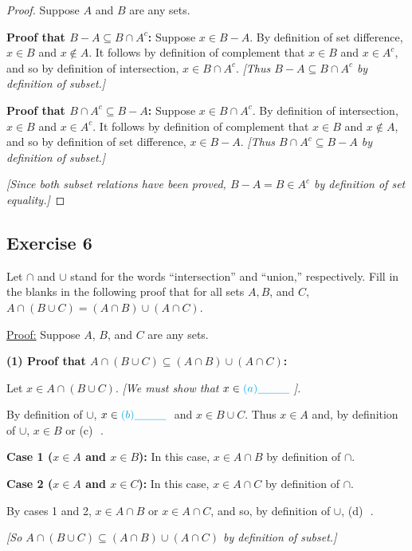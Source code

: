 \documentclass[14pt]{extarticle}
\newcommand{\fbl}{\underline{\hspace{1cm}}\,\,}
\newcommand{\cy}{\color{cyan}}
\begin{document}
\begin{proof}
  Suppose $A$ and $B$ are any sets.

    {\bf Proof that \(B - A \subseteq B \cap A^c\):} Suppose \(x \in B - A\). By definition of set difference,
  \(x \in B\) and \(x \notin A\). It follows by definition of complement that \(x \in B\) and \(x \in A^c\), and so by
  definition of intersection, \(x \in B \cap A^c\). {\it [Thus \(B - A \subseteq B \cap A^c\) by definition of subset.]}

    {\bf Proof that \(B \cap A^c \subseteq B - A\):} Suppose \(x \in B \cap A^c\). By definition of intersection,
  \(x \in B\) and \(x \in A^c\). It follows by definition of complement that \(x \in B\) and \(x \notin A\), and so by
  definition of set difference, \(x \in B - A\). {\it [Thus \(B \cap A^c \subseteq B - A\) by definition of subset.]}

    {\it [Since both subset relations have been proved, \(B - A = B \in A^c\) by definition of set equality.]}
\end{proof}

\subsection{Exercise 6}
Let $\cap$ and $\cup$ stand for the words “intersection” and “union,” respectively. Fill in the blanks in the
following proof that for all sets $A, B$, and $C$, \(A \cap (B \cup C) = (A \cap B) \cup (A \cap C)\).

\underline{Proof:} Suppose $A$, $B$, and $C$ are any sets.

  {\bf (1) Proof that \(A \cap (B \cup C) \subseteq (A \cap B) \cup (A \cap C)\):}

Let \(x \in A \cap (B \cup C)\). {\it [We must show that \(x \in {\cy (a) \fbl}\)].}

By definition of $\cup$, \(x \in {\cy (b) \fbl}\) and \(x \in B \cup C\).
Thus \(x \in A\) and, by definition of $\cup$, \(x \in B\) or {\cy (c) \fbl}.

{\bf Case 1 (\(x \in A\) and \(x \in B\)):} In this case, \(x \in A \cap B\) by definition of $\cap$.

  {\bf Case 2 (\(x \in A\) and \(x \in C\)):} In this case, \(x \in A \cap C\) by definition of $\cap$.

By cases 1 and 2, \(x \in A \cap B\) or \(x \in A \cap C\), and so, by definition of $\cup$, {\cy (d) \fbl}.

{\it [So \(A \cap (B \cup C ) \subseteq (A \cap B) \cup (A \cap C)\) by definition of subset.]}
\end{document}
